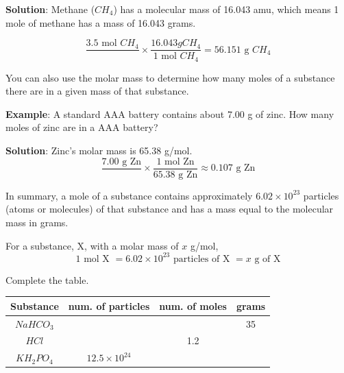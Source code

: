 \textbf{Solution}: Methane ($CH_4$) has a molecular mass of 16.043 amu, which 
means 1 mole of methane has a mass of 16.043 grams. 

$$\frac{3.5\text{ mol }CH_4}{} \times \frac{16.043{ g }CH_4}{1\text{ mol }CH_4} = 
56.151\text{ g }CH_4$$

You can also use the molar mass to determine how many moles of a substance there 
are in a given mass of that substance.

\textbf{Example}: A standard AAA battery contains about 7.00 g of zinc. How many 
moles of zinc are in a AAA battery?

\textbf{Solution}: Zinc's molar mass is 65.38 g/mol. 
$$\frac{7.00\text{ g Zn}}{} \times \frac{1\text{ mol Zn}}{65.38\text{ g Zn}} 
\approx 0.107\text{ g Zn}$$

In summary, a mole of a substance contains approximately $6.02 \times 10^{23}$ 
particles (atoms or molecules) of that substance and has a mass equal to the 
molecular mass in grams. 

\begin{mdframed}[frametitle = {The Mole Concept}, style = important]
For a substance, X, with a molar mass of $x$ g/mol,
$$1\text{ mol X } = 6.02 \times 10^{23}\text{ particles of X }= x\text{ g of X}$$
\end{mdframed}

\begin{Exercise}[title = {Grams, Moles, Molecules, and Atoms}, label = convert]
Complete the table.

\begin{tabular}{|c|c|c|c|}
\hline
Substance & num. of particles & num. of moles & grams\\\hline
$NaHCO_3$ & & & 35\\\hline
$HCl$ & & 1.2 & \\\hline
$KH_2PO_4$ & $12.5 \times 10^{24}$ & & \\\hline
\end{tabular}
\vspace{75mm}
\end{Exercise}

